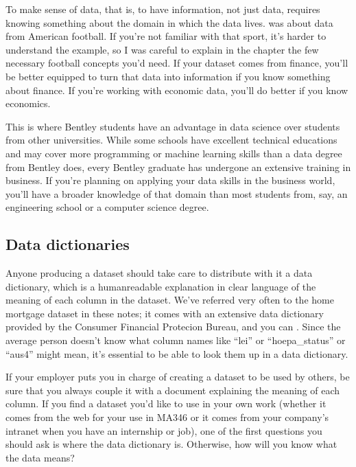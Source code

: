 \documentclass[letterpaper,10pt,english]{sphinxmanual}
\begin{document}
To make sense of data, that is, to have information, not just data, requires knowing something about the domain in which the data lives.   was about data from American football.  If you’re not familiar with that sport, it’s harder to understand the example, so I was careful to explain in the chapter the few necessary football concepts you’d need.  If your dataset comes from finance, you’ll be better equipped to turn that data into information if you know something about finance.  If you’re working with economic data, you’ll do better if you know economics.

This is where Bentley students have an advantage in data science over students from other universities.  While some schools have excellent technical educations and may cover more programming or machine learning skills than a data degree from Bentley does, every Bentley graduate has undergone an extensive training in business.  If you’re planning on applying your data skills in the business world, you’ll have a broader knowledge of that domain than most students from, say, an engineering school or a computer science degree.


\subsection{Data dictionaries}
\label{\detokenize{chapter-13-etl:data-dictionaries}}
Anyone producing a dataset should take care to distribute with it a data dictionary, which is a human\sphinxhyphen{}readable explanation in clear language of the meaning of each column in the dataset.  We’ve referred very often to the home mortgage dataset in these notes; it comes with an extensive data dictionary provided by the Consumer Financial Protecion Bureau, and you can .  Since the average person doesn’t know what column names like “lei” or “hoepa\_status” or “aus\sphinxhyphen{}4” might mean, it’s essential to be able to look them up in a data dictionary.

If your employer puts you in charge of creating a dataset to be used by others, be sure that you always couple it with a document explaining the meaning of each column.  If you find a dataset you’d like to use in your own work (whether it comes from the web for your use in MA346 or it comes from your company’s intranet when you have an internship or job), one of the first questions you should ask is where the data dictionary is.  Otherwise, how will you know what the data means?
\end{document}
